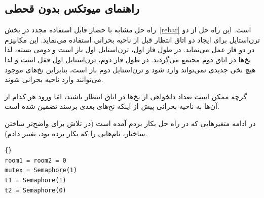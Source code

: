 \documentclass{book}
\newcommand{\clearemptydoublepage}{\newpage\cleardoublepage}
\begin{document}
\clearemptydoublepage
\subsection{راهنمای میوتکس بدون قحطی}
\label{morris}

    راه حل  مشابه با حصار قابل استفاده مجدد در بخش~\ref{rebar} است. 
    این راه حل از دو ترن‌استایل برای ایجاد دو اتاق انتظار قبل از ناحیه بحرانی استفاده می‌نماید. این مکانیزم در دو فاز عمل می‌نماید. 
    در طول فاز اول، ترن‌استایل اول باز است و دومی بسته، لذا نخ‌ها در اتاق دوم مجتمع می‌گردند. در طول فاز دوم، ترن‌استایل اول قفل است  و لذا هیچ 
    نخی جدیدی نمی‌تواند وارد شود و ترن‌استایل دوم باز است، بنابراین نخ‌های موجود می‌توانند وارد ناحیه بحرانی شوند. 

    گرچه ممکن است تعداد دلخواهی از نخ‌ها در اتاق انتظار باشند، امّا  ورود هر کدام از آن‌ها به ناحیه بحرانی پیش از اینکه نخ‌های بعدی برسند تضمین شده است. 

    در ادامه متغیرهایی که در راه حل بکار بردم آمده است (در تلاش برای واضح‌تر ساختن ساختار، نام‌هایی را که  بکار برده بود، تغییر دادم). 

\begin{latin}
\begin{latin}
\begin{lstlisting}[title=\rl{راهنمایی میوتکس بدون قحطی}]{}
room1 = room2 = 0
mutex = Semaphore(1)
t1 = Semaphore(1)
t2 = Semaphore(0)
\end{lstlisting}
\end{latin}
\end{latin}
\end{document}
